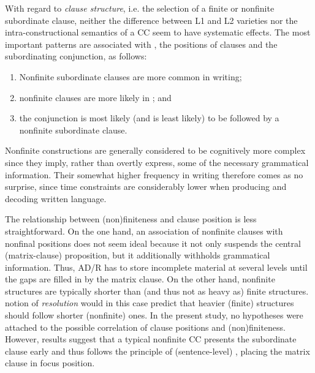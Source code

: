 With regard to \emph{clause structure}, i.e. the selection of a finite or nonfinite subordinate clause, neither the difference between L1 and L2 varieties nor the intra-constructional semantics of a CC seem to have systematic effects. The most important patterns are associated with , the positions of clauses and the subordinating conjunction, as follows:

\begin{enumerate}
  \item {}Nonfinite subordinate clauses are more common in writing;
  \item {}nonfinite clauses are more likely in ; and
  \item the conjunction  is most likely (and  is least likely) to be followed by a nonfinite subordinate clause.
\end{enumerate}

\begin{sloppypar}
Nonfinite constructions are generally considered to be cognitively more complex since they imply, rather than overtly express, some of the necessary grammatical information. Their somewhat higher frequency in writing therefore comes as no surprise, since time constraints are considerably lower when producing and decoding written language.
\end{sloppypar}

The relationship between (non)finiteness and clause position is less straightforward. On the one hand, an association of nonfinite clauses with nonfinal positions does not seem ideal because it not only suspends the central (matrix-clause) proposition, but it additionally withholds grammatical information. Thus, AD/R has to store incomplete material at several levels until the gaps are filled in by the matrix clause. On the other hand, nonfinite structures are typically shorter than (and thus not as heavy as) finite structures.  notion of \textit{resolution} would in this case predict that heavier (finite) structures should follow shorter (nonfinite) ones. In the present study, no hypotheses were attached to the possible correlation of clause positions and (non)finiteness. However, results suggest that a typical nonfinite CC presents the subordinate clause early and thus follows the principle of (sentence-level) , placing the matrix clause in focus position.

